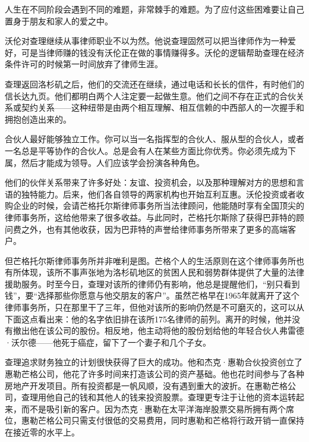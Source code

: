 \begin{WisdomBox}
\par

人生在不同阶段会遇到不同的难题，非常棘手的难题。为了应付这些困难要让自己置身于朋友和家人的爱之中。
\par
\end{WisdomBox}

沃伦对查理继续从事律师职业不以为然。他说查理固然可以把当律师作为一种爱好，可是当律师赚的钱没有沃伦正在做的事情赚得多。沃伦的逻辑帮助查理在经济条件许可的时候第一时间放弃了律师生涯。
\par

查理返回洛杉矶之后，他们的交流还在继续，通过电话和长长的信件，有时他们的信长达九页。他们都明白两个人注定要一起做生意。他们之间不存在正式的合伙关系或契约关系——这种纽带是由两个相互理解、相互信赖的中西部人的一次握手和拥抱创造出来的。
\par

\begin{WisdomBox}
\par

合伙人最好能够独立工作。你可以当一名指挥型的合伙人、服从型的合伙人，或者一名总是平等协作的合伙人。总是会有人在某些方面比你优秀。你必须先成为下属，然后才能成为领导。人们应该学会扮演各种角色。
\par
\end{WisdomBox}

他们的伙伴关系带来了许多好处：友谊、投资机会，以及那种理解对方的思想和言语的独特能力。后来，他们各自领导的两家机构也开始互利互惠。沃伦投资或者收购企业的时候，会请芒格托尔斯律师事务所当法律顾问，他能随时享有全国顶尖的律师事务所，这给他带来了很多收益。与此同时，芒格托尔斯除了获得巴菲特的顾问费之外，也有其他收获，因为巴菲特的声誉给律师事务所带来了更多的高端客户。
\par

但芒格托尔斯律师事务所并非唯利是图。芒格个人的生活原则在这个律师事务所也有所体现，该所不事声张地为洛杉矶地区的贫困人民和弱势群体提供了大量的法律援助服务。时至今日，查理对该所的律师仍有影响，他总是提醒他们，“别只看到钱”，要“选择那些你愿意与他交朋友的客户”。虽然芒格早在1965年就离开了这个律师事务所，只在那里干了三年，但他对该所的影响仍然是不可磨灭的，这可以从下面这点看出来：他的名字依旧排在该所175名律师的前列。离开的时候，他并没有撤出他在该公司的股份。相反地，他主动将他的股份划给他的年轻合伙人弗雷德·沃尔德——他死于癌症，留下了一个妻子和几个子女。
\par

查理追求财务独立的计划很快获得了巨大的成功。他和杰克·惠勒合伙投资创立了惠勒芒格公司，他花了许多时间来打造该公司的资产基础。他也花时间参与了各种房地产开发项目。所有投资都是一帆风顺，没有遇到重大的波折。在惠勒芒格公司，查理用他自己的钱和其他人的钱来投资股票。查理更专注于让他的资本运转起来，而不是吸引新的客户。因为杰克·惠勒在太平洋海岸股票交易所拥有两个席位，惠勒芒格公司只需支付很低的交易费用，同时惠勒和芒格将行政开销一直保持在接近零的水平上。
\par

